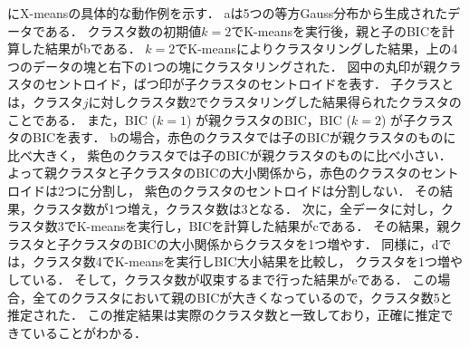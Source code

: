 にX-meansの具体的な動作例を示す．
aは5つの等方Gauss分布から生成されたデータである．
クラスタ数の初期値$k=2$でK-meansを実行後，親と子のBICを計算した結果がbである．
$k=2$でK-meansによりクラスタリングした結果，上の4つのデータの塊と右下の1つの塊にクラスタリングされた．
図中の丸印が親クラスタのセントロイド，ばつ印が子クラスタのセントロイドを表す．
子クラスとは，クラスタ$j$に対しクラスタ数2でクラスタリングした結果得られたクラスタのことである．
また，BIC ($k=1$) が親クラスタのBIC，BIC ($k=2$) が子クラスタのBICを表す．
bの場合，赤色のクラスタでは子のBICが親クラスタのものに比べ大きく，
紫色のクラスタでは子のBICが親クラスタのものに比べ小さい．
よって親クラスタと子クラスタのBICの大小関係から，赤色のクラスタのセントロイドは2つに分割し，
紫色のクラスタのセントロイドは分割しない．
その結果，クラスタ数が1つ増え，クラスタ数は3となる．
次に，全データに対し，クラスタ数3でK-meansを実行し，BICを計算した結果がcである．
その結果，親クラスタと子クラスタのBICの大小関係からクラスタを1つ増やす．
同様に，dでは，クラスタ数4でK-meansを実行しBIC大小結果を比較し，
クラスタを1つ増やしている．
そして，クラスタ数が収束するまで行った結果がeである．
この場合，全てのクラスタにおいて親のBICが大きくなっているので，クラスタ数5と推定された．
この推定結果は実際のクラスタ数と一致しており，正確に推定できていることがわかる．


